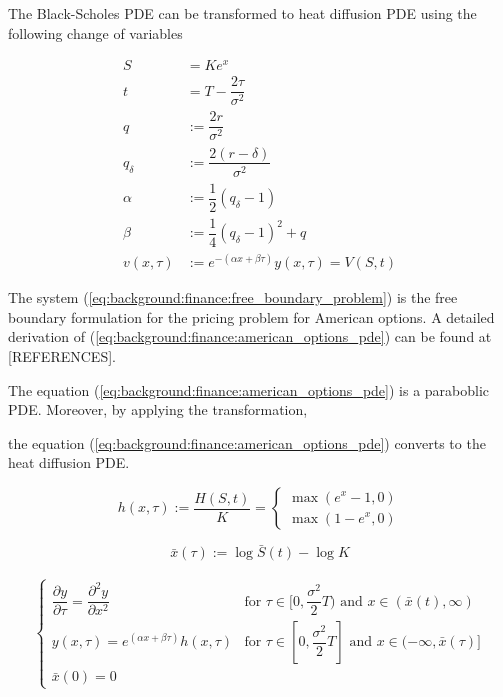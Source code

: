 The Black-Scholes PDE can be transformed to heat diffusion PDE using the following
change of variables

\begin{align*}
  S &= Ke^x \\
  t &= T - \dfrac{2\tau}{\sigma^2} \\ 
  q &:= \dfrac{2r}{\sigma^2} \\
  q_{\delta} &:= \dfrac{2(r-\delta)}{\sigma^2} \\
  \alpha &:= \dfrac{1}{2}(q_{\delta} - 1) \\
  \beta &:= \dfrac{1}{4}(q_{\delta} - 1)^2 + q \\
  v(x, \tau) &:= e^{-(\alpha x + \beta \tau)}y(x, \tau)= V(S, t)
\end{align*}

The system (\ref{eq:background:finance:free_boundary_problem}) 
is the free boundary formulation for the pricing problem for American options.
A detailed derivation of (\ref{eq:background:finance:american_options_pde}) 
can be found at [REFERENCES].


The equation (\ref*{eq:background:finance:american_options_pde}) 
is a paraboblic PDE. Moreover, by applying the transformation,


the equation (\ref*{eq:background:finance:american_options_pde}) converts 
to the heat diffusion PDE.

\begin{equation}
  h(x, \tau) := \dfrac{H(S, t)}{K} = \begin{cases}
    \max(e^{x} - 1, 0)\\
    \max(1 - e^{x}, 0)
  \end{cases} 
\end{equation}

\begin{equation}
  \bar{x}(\tau) := \log{\bar{S}(t)} - \log{K} 
\end{equation}

\begin{align}
  \begin{cases}
    \dfrac{\partial y}{\partial \tau} = \dfrac{\partial^2 y}{\partial x^2} & \text{for $\tau\in[0,\dfrac{\sigma^2}{2}T)$ and $x\in(\bar{x}(t), \infty)$} \\
    y(x, \tau) = e^{(\alpha x + \beta \tau)}h(x, \tau) & \text{for $\tau\in[0, \dfrac{\sigma^2}{2}T]$ and $x\in(-\infty, \bar{x}(\tau)]$} \\
    \bar{x}(0) = 0
  \end{cases}
  \label{eq:background:finance:american_option_heat_equation}
\end{align}

